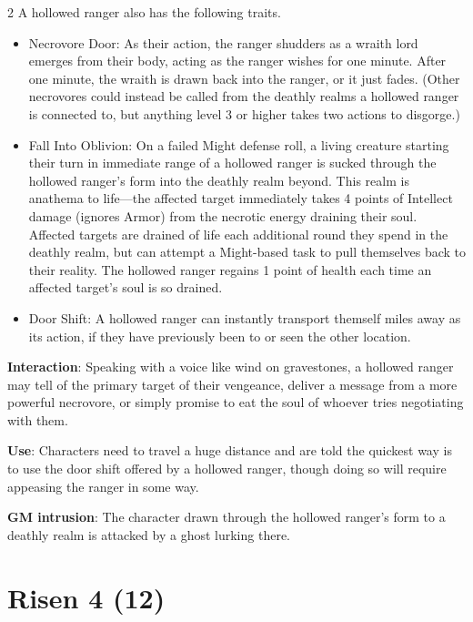 \begin{multicols}{2}
A hollowed ranger also has the following traits. 
\begin{itemize}
\item	Necrovore Door: As their action, the ranger shudders as a wraith lord emerges from their body, acting as the ranger wishes for one minute. After one minute, the wraith is drawn back into the ranger, or it just fades. (Other necrovores could instead be called from the deathly realms a hollowed ranger is connected to, but anything level 3 or higher takes two actions to disgorge.) 
\item	Fall Into Oblivion: On a failed Might defense roll, a living creature starting their turn in immediate range of a hollowed ranger is sucked through the hollowed ranger’s form into the deathly realm beyond. This realm is anathema to life—the affected target immediately takes 4 points of Intellect damage (ignores Armor) from the necrotic energy draining their soul. Affected targets are drained of life each additional round they spend in the deathly realm, but can attempt a Might-based task to pull themselves back to their reality. The hollowed ranger regains 1 point of health each time an affected target’s soul is so drained. 
\item	Door Shift: A hollowed ranger can instantly transport themself miles away as its action, if they have previously been to or seen the other location. 
\end{itemize}

\textbf{Interaction}: Speaking with a voice like wind on gravestones, a hollowed ranger may tell of the primary target of their vengeance, deliver a message from a more powerful necrovore, or simply promise to eat the soul of whoever tries negotiating with them. 

\textbf{Use}: Characters need to travel a huge distance and are told the quickest way is to use the door shift offered by a hollowed ranger, though doing so will require appeasing the ranger in some way.

\textbf{GM intrusion}: The character drawn through the hollowed ranger’s form to a deathly realm is attacked by a ghost lurking there.

\section{Risen 4 (12)}


\end{multicols}
